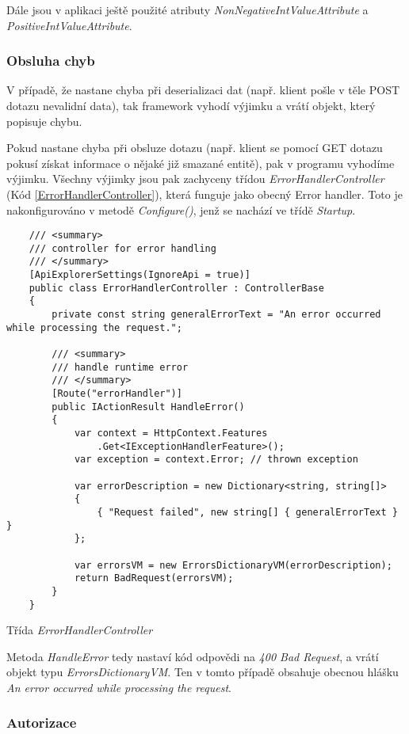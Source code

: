 Dále jsou v aplikaci ještě použité atributy \textit{NonNegativeIntValueAttribute} a \textit{PositiveIntValueAttribute}.


\subsubsection*{Obsluha chyb}

V případě, že nastane chyba při deserializaci dat (např. klient pošle v těle POST dotazu nevalidní data), tak framework vyhodí výjimku a vrátí objekt, který popisuje chybu. \cite{AspNetCoreDocs}

Pokud nastane chyba při obsluze dotazu (např. klient se pomocí GET dotazu pokusí získat informace o nějaké již smazané entitě), pak v programu vyhodíme výjimku. Všechny výjimky jsou pak zachyceny třídou \textit{ErrorHandlerController} (Kód \ref{ErrorHandlerController}), která funguje jako obecný Error handler.
Toto je nakonfigurováno v metodě \textit{Configure()}, jenž se nachází ve třídě \textit{Startup}.

\begin{program}
	\begin{lstlisting}
	/// <summary>
	/// controller for error handling
	/// </summary>
	[ApiExplorerSettings(IgnoreApi = true)]
	public class ErrorHandlerController : ControllerBase
	{
		private const string generalErrorText = "An error occurred while processing the request.";
		
		/// <summary>
		/// handle runtime error
		/// </summary>
		[Route("errorHandler")]
		public IActionResult HandleError()
		{
			var context = HttpContext.Features
				.Get<IExceptionHandlerFeature>();
			var exception = context.Error; // thrown exception
			
			var errorDescription = new Dictionary<string, string[]>
			{
				{ "Request failed", new string[] { generalErrorText } }
			};
			
			var errorsVM = new ErrorsDictionaryVM(errorDescription);
			return BadRequest(errorsVM);
		}
	}
	\end{lstlisting}
	\caption{Třída \textit{ErrorHandlerController}}
	\label{ErrorHandlerController}
\end{program}

Metoda \textit{HandleError} tedy nastaví kód odpovědi na \textit{400 Bad Request}, a vrátí objekt typu \textit{ErrorsDictionaryVM}.
Ten v tomto případě obsahuje obecnou hlášku \textit{An error occurred while processing the request}.

\subsubsection*{Autorizace}

